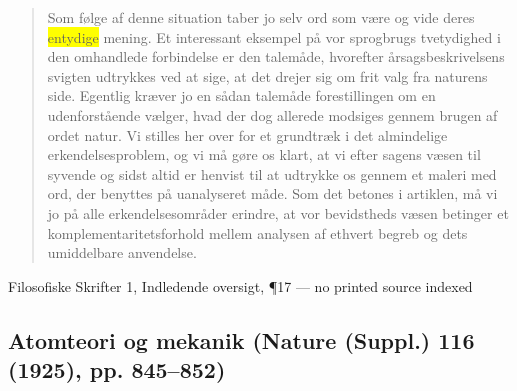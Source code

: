 \documentclass[11pt]{article}
\newcommand{\dcite}[1]{{\nopagebreak\raggedleft\small #1\par}\medskip}
\newcommand{\tlg}[1]{{\setlength{\fboxsep}{0.8pt}\colorbox{yellow}{#1}}}
\begin{document}
\begin{quote}
Som følge af denne situation taber jo selv ord som være og vide deres \tlg{entydige} mening. Et interessant eksempel på vor sprogbrugs tvetydighed i den omhandlede forbindelse er den talemåde, hvorefter årsagsbeskrivelsens svigten udtrykkes ved at sige, at det drejer sig om frit valg fra naturens side. Egentlig kræver jo en sådan talemåde forestillingen om en udenforstående vælger, hvad der dog allerede modsiges gennem brugen af ordet natur. Vi stilles her over for et grundtræk i det almindelige erkendelsesproblem, og vi må gøre os klart, at vi efter sagens væsen til syvende og sidst altid er henvist til at udtrykke os gennem et maleri med ord, der benyttes på uanalyseret måde. Som det betones i artiklen, må vi jo på alle erkendelsesområder erindre, at vor bevidstheds væsen betinger et komplementaritetsforhold mellem analysen af ethvert begreb og dets umiddelbare anvendelse.
\end{quote}
\dcite{Filosofiske Skrifter 1, Indledende oversigt, ¶17 — no printed source indexed}

\subsection{Atomteori og mekanik \normalfont(Nature (Suppl.) 116 (1925), pp. 845–852)}
\end{document}
